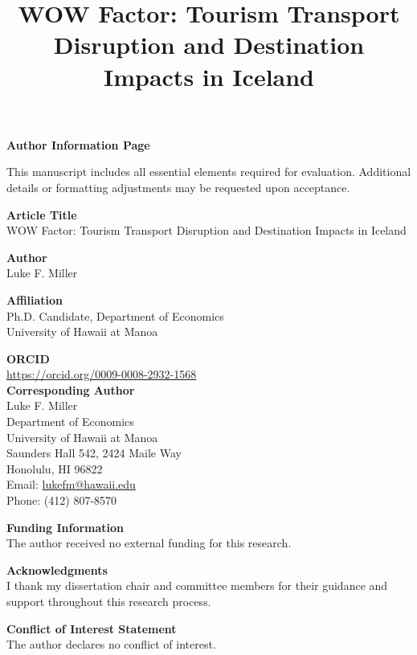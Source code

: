 \documentclass[12pt]{article}
\title{WOW Factor: Tourism Transport Disruption and Destination Impacts in Iceland}
\author{}
\date{}
\begin{document}
 

\hypersetup{pageanchor=false}

\maketitle 

\thispagestyle{empty} \clearpage

\begin{titlepage} 
\singlespacing \begin{center} 
{\Large \textbf{Author Information Page}} 
\end{center} 

\noindent This manuscript includes all essential elements required for evaluation. Additional details or formatting adjustments may be requested upon acceptance. 

\vspace{1em} 

\noindent \textbf{Article Title}\\ WOW Factor: Tourism Transport Disruption and Destination Impacts in Iceland
\vspace{1em} 

\noindent \textbf{Author}\\ Luke F. Miller \vspace{1em} 

\noindent \textbf{Affiliation}\\ Ph.D. Candidate, Department of Economics\\ University of Hawaii at Manoa \vspace{1em} 

\noindent \textbf{ORCID}\\ \url{https://orcid.org/0009-0008-2932-1568} \vspace{1em} \noindent \\  \textbf{Corresponding Author}\\ Luke F. Miller\\ Department of Economics\\ University of Hawaii at Manoa\\ Saunders Hall 542, 2424 Maile Way\\ Honolulu, HI 96822\\ Email: \href{mailto:lukefm@hawaii.edu}{lukefm@hawaii.edu}\\ Phone: (412) 807-8570 \vspace{1em} 

\noindent \textbf{Funding Information}\\ The author received no external funding for this research. \vspace{1em} 

\noindent \textbf{Acknowledgments}\\ I thank my dissertation chair and committee members for their guidance and support throughout this research process. \vspace{1em} 

\noindent \textbf{Conflict of Interest Statement}\\ The author declares no conflict of interest. 

\end{titlepage} \clearpage 
\end{document}
